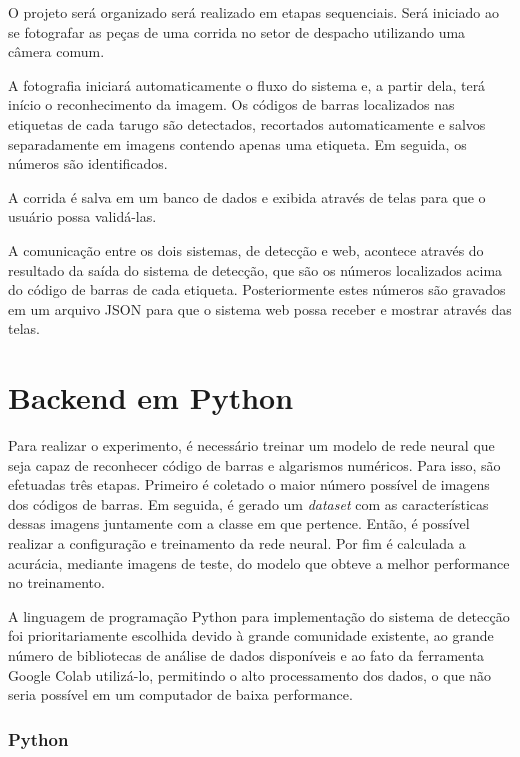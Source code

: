 O projeto será organizado será realizado em etapas sequenciais. Será iniciado ao se fotografar as peças de uma corrida no setor de despacho utilizando uma câmera comum. 

A fotografia iniciará automaticamente o fluxo do sistema e, a partir dela, terá início o reconhecimento da imagem. Os códigos de barras localizados nas etiquetas de cada tarugo são detectados, recortados automaticamente e salvos separadamente em imagens contendo apenas uma etiqueta. Em seguida, os números são identificados.

A corrida é salva em um banco de dados e exibida através de telas para que o usuário possa validá-las.

A comunicação entre os dois sistemas, de detecção e web, acontece através do resultado da saída do sistema de detecção, que são os números localizados acima do código de barras de cada etiqueta. Posteriormente estes números são  gravados em um arquivo JSON para que o sistema web possa receber e mostrar através das telas. 


\section{Backend em Python} \label{sec:backend}

Para realizar o experimento, é necessário treinar um modelo de rede neural que seja capaz de reconhecer código de barras e algarismos numéricos. Para isso, são efetuadas três etapas. Primeiro é coletado o maior número possível de imagens dos códigos de barras. Em seguida, é gerado um \textit{dataset} com as características dessas imagens juntamente com a classe em que pertence. Então, é possível realizar a configuração e treinamento da rede neural. Por fim é calculada a acurácia, mediante imagens de teste, do modelo que obteve a melhor performance no treinamento.

A linguagem de programação Python para implementação do sistema de detecção foi prioritariamente escolhida devido à grande comunidade existente, ao grande número de bibliotecas de análise de dados disponíveis e ao fato da ferramenta Google Colab utilizá-lo, permitindo o alto processamento dos dados, o que não seria possível em um computador de baixa performance.


\subsubsection*{Python}

